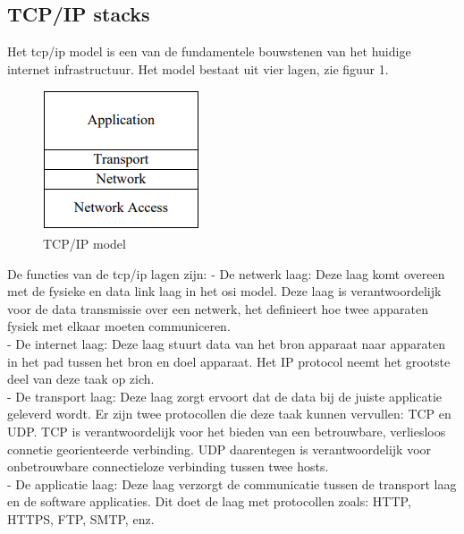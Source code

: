 \documentclass[../DCM2_Verslag.tex]{subfiles}
\begin{document}
\subsection{TCP/IP stacks}
Het tcp/ip model is een van de fundamentele bouwstenen van het huidige internet infrastructuur. Het model bestaat uit vier lagen, zie figuur 1.\\
\begin{figure}[h]
\centering
\includegraphics[scale=2]{tcp_ip_model}
\caption{TCP/IP model}
\end{figure}
De functies van de tcp/ip lagen zijn:
- De netwerk laag: Deze laag komt overeen met de fysieke en data link laag in het osi model. Deze laag is verantwoordelijk voor de data transmissie over een netwerk, het definieert hoe twee apparaten fysiek met elkaar moeten communiceren.
\\
- De internet laag: Deze laag stuurt data van het bron apparaat naar apparaten in het pad tussen het bron en doel apparaat. Het IP protocol neemt het grootste deel van deze taak op zich.
\\
- De transport laag: Deze laag zorgt ervoort dat de data bij de juiste applicatie geleverd wordt. Er zijn twee protocollen die deze taak kunnen vervullen: TCP en UDP. TCP is verantwoordelijk voor het bieden van een betrouwbare, verliesloos connetie georienteerde verbinding. UDP daarentegen is verantwoordelijk voor onbetrouwbare connectieloze verbinding tussen twee hosts.
\\
- De applicatie laag: Deze laag verzorgt de communicatie tussen de transport laag en de software applicaties. Dit doet de laag met protocollen zoals: HTTP, HTTPS, FTP, SMTP, enz.
\\
\end{document}
